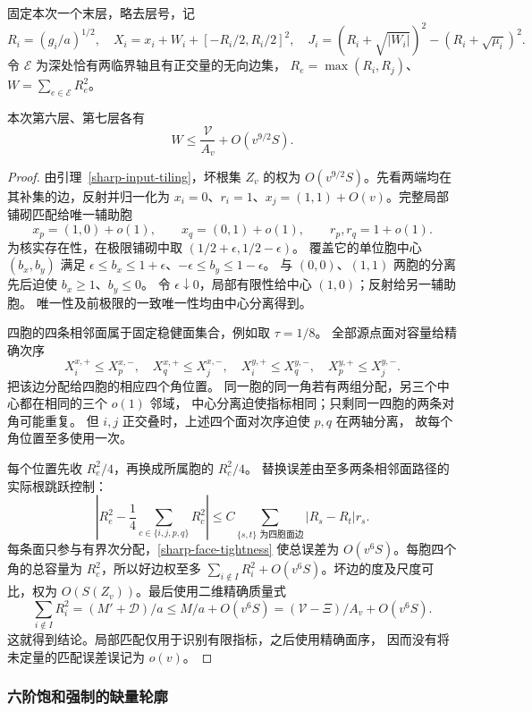 固定本次一个末层，略去层号，记
\[
 R_i=(g_i/a)^{1/2},\quad X_i=x_i+W_i+[-R_i/2,R_i/2]^2,
 \quad J_i=(R_i+\sqrt{|W_i|})^2-(R_i+\sqrt{\mu_i})^2.
\]
令 \(\mathscr E\) 为深处恰有两临界轴且有正交量的无向边集，
\(R_e=\max(R_i,R_j)\)、\(W=\sum_{e\in\mathscr E}R_e^2\)。
\begin{lemma}[实际半径的角计数]\label{planar:actual-incidence}
本次第六层、第七层各有
\begin{equation}\label{planar:actual-weight}
 W\le\frac{\mathcal V}{A_v}+O(v^{9/2}S).
\end{equation}
\end{lemma}
\begin{proof}
由引理~\ref{sharp-input-tiling}，坏根集 \(Z_v\) 的权为
\(O(v^{9/2}S)\)。先看两端均在其补集的边，反射并归一化为
\(x_i=0\)、\(r_i=1\)、\(x_j=(1,1)+O(v)\)。完整局部铺砌匹配给唯一辅助胞
\[
 x_p=(1,0)+o(1),\qquad x_q=(0,1)+o(1),\qquad r_p,r_q=1+o(1).
\]
为核实存在性，在极限铺砌中取 \((1/2+\epsilon,1/2-\epsilon)\)。
覆盖它的单位胞中心 \((b_x,b_y)\) 满足
\(\epsilon\le b_x\le1+\epsilon\)、\(-\epsilon\le b_y\le1-\epsilon\)。
与 \((0,0)\)、\((1,1)\) 两胞的分离先后迫使 \(b_x\ge1\)、\(b_y\le0\)。
令 \(\epsilon\downarrow0\)，局部有限性给中心 \((1,0)\)；反射给另一辅助胞。
唯一性及前极限的一致唯一性均由中心分离得到。

四胞的四条相邻面属于固定稳健面集合，例如取 \(\tau=1/8\)。
全部源点面对容量给精确次序
\[
 X_i^{x,+}\le X_p^{x,-},\quad X_q^{x,+}\le X_j^{x,-},\quad
 X_i^{y,+}\le X_q^{y,-},\quad X_p^{y,+}\le X_j^{y,-}.
\]
把该边分配给四胞的相应四个角位置。
同一胞的同一角若有两组分配，另三个中心都在相同的三个 \(o(1)\) 邻域，
中心分离迫使指标相同；只剩同一四胞的两条对角可能重复。
但 \(i,j\) 正交叠时，上述四个面对次序迫使 \(p,q\) 在两轴分离，
故每个角位置至多使用一次。

每个位置先收 \(R_e^2/4\)，再换成所属胞的 \(R_c^2/4\)。
替换误差由至多两条相邻面路径的实际根跳跃控制：
\[
 \left|R_e^2-\frac14\sum_{c\in\{i,j,p,q\}}R_c^2\right|
 \le C\sum_{\{s,t\}\text{ 为四胞面边}}|R_s-R_t|r_s.
\]
每条面只参与有界次分配，\eqref{sharp-face-tightness} 使总误差为
\(O(v^6S)\)。每胞四个角的总容量为 \(R_c^2\)，所以好边权至多
\(\sum_{i\notin I}R_i^2+O(v^6S)\)。坏边的度及尺度可比，权为
\(O(S(Z_v))\)。最后使用二维精确质量式
\[
 \sum_{i\notin I}R_i^2=(M'+\mathcal D)/a
 \le M/a+O(v^6S)=(\mathcal V-\Xi)/A_v+O(v^6S).
\]
这就得到结论。局部匹配仅用于识别有限指标，之后使用精确面序，
因而没有将未定量的匹配误差误记为 \(o(v)\)。
\end{proof}

\subsubsection{六阶饱和强制的缺量轮廓}

